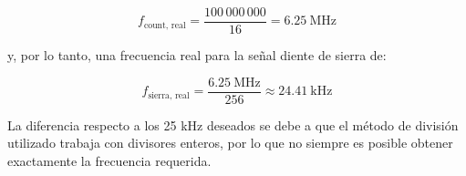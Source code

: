 \documentclass[letterpaper, 12pt]{article}
\begin{document}
\[
f_{\text{count, real}} = \frac{100\,000\,000}{16} = 6.25\ \text{MHz}
\]

y, por lo tanto, una frecuencia real para la señal diente de sierra de:

\[
f_{\text{sierra, real}} = \frac{6.25\ \text{MHz}}{256} \approx 24.41\ \text{kHz}
\]

La diferencia respecto a los 25 kHz deseados se debe a que el método de división utilizado trabaja con divisores enteros, por lo que no siempre es posible obtener exactamente la frecuencia requerida.
\end{document}
